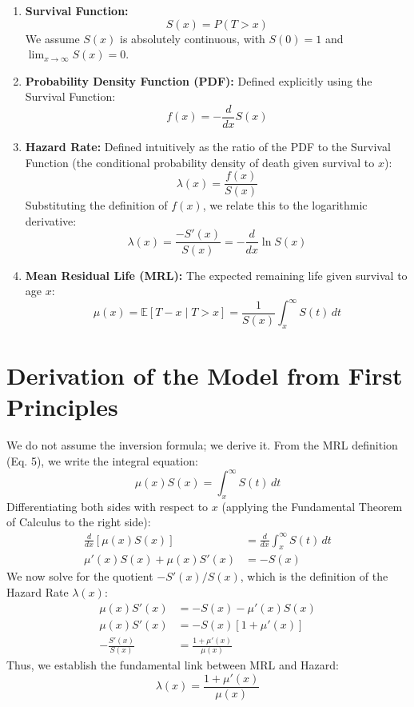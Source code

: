 \documentclass{article}
\begin{document}
	\begin{enumerate}
		\item \textbf{Survival Function:} 
		$$S(x) = P(T > x)$$
		We assume $S(x)$ is absolutely continuous, with $S(0)=1$ and $\lim_{x \to \infty} S(x) = 0$.
		
		\item \textbf{Probability Density Function (PDF):}
		Defined explicitly using the Survival Function:
		\begin{equation}
			f(x) = -\frac{d}{dx} S(x)
		\end{equation}
		
		\item \textbf{Hazard Rate:}
		Defined intuitively as the ratio of the PDF to the Survival Function (the conditional probability density of death given survival to $x$):
		\begin{equation}
			\lambda(x) = \frac{f(x)}{S(x)}
		\end{equation}
		Substituting the definition of $f(x)$, we relate this to the logarithmic derivative:
		\begin{equation}
			\lambda(x) = \frac{-S'(x)}{S(x)} = -\frac{d}{dx} \ln S(x)
		\end{equation}
		
		\item \textbf{Mean Residual Life (MRL):}
		The expected remaining life given survival to age $x$:
		\begin{equation}
			\mu(x) = \mathbb{E}[T - x \mid T > x] = \frac{1}{S(x)} \int_x^{\infty} S(t) \, dt
		\end{equation}
	\end{enumerate}
	
	\section{Derivation of the Model from First Principles}
	
	We do not assume the inversion formula; we derive it.
	From the MRL definition (Eq. 5), we write the integral equation:
	\begin{equation}
		\mu(x) S(x) = \int_x^{\infty} S(t) \, dt
	\end{equation}
	Differentiating both sides with respect to $x$ (applying the Fundamental Theorem of Calculus to the right side):
	\begin{align*}
		\frac{d}{dx} [\mu(x) S(x)] &= \frac{d}{dx} \int_x^{\infty} S(t) \, dt \\
		\mu'(x) S(x) + \mu(x) S'(x) &= -S(x)
	\end{align*}
	We now solve for the quotient $-S'(x)/S(x)$, which is the definition of the Hazard Rate $\lambda(x)$:
	\begin{align*}
		\mu(x) S'(x) &= -S(x) - \mu'(x) S(x) \\
		\mu(x) S'(x) &= -S(x) [1 + \mu'(x)] \\
		-\frac{S'(x)}{S(x)} &= \frac{1 + \mu'(x)}{\mu(x)}
	\end{align*}
	Thus, we establish the fundamental link between MRL and Hazard:
	\begin{equation}
		\lambda(x) = \frac{1 + \mu'(x)}{\mu(x)}
	\end{equation}
	
\end{document}
